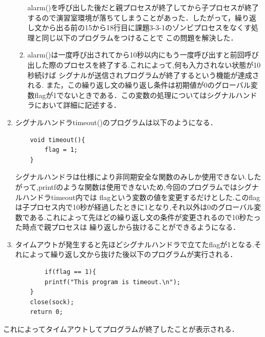 \documentclass[dvipdfmx]{jarticle}
\begin{document}
\begin{enumerate}
\begin{enumerate}
        alarm()を呼び出した後だと親プロセスが終了してから子プロセスが終了するので演習室環境が落ちてしまうことがあった．したがって，繰り返し文から出る前の15から18行目に課題3-3-1のゾンビプロセスをなくす処理と同じ以下のプログラムをつけることで
        この問題を解決した．
        \item alarm()は一度呼び出されてから10秒以内にもう一度呼び出すと前回呼び出した際のプロセスを終了する.これによって,何も入力されない状態が10秒続けば
        シグナルが送信されプログラムが終了するという機能が達成される.
        また，この繰り返し文の繰り返し条件は初期値が0のグローバル変数flagが1でないときである．この変数の処理についてはシグナルハンドラにおいて詳細に記述する．
    \end{enumerate}
    \item シグナルハンドラtimeout()のプログラムは以下のようになる．
    \begin{lstlisting}
    void timeout(){
        flag = 1;
    }
    \end{lstlisting}
    シグナルハンドラは仕様により非同期安全な関数のみしか使用できない.したがって,printfのような関数は使用できないため,今回のプログラムではシグナルハンドラtimeout内では
    flagという変数の値を変更するだけとした.このflagは子プロセス内で10秒が経過したときに1となり,それ以外は0のグローバル変数である.これによって先ほどの繰り返し文の条件が変更されるので10秒たった時点で親プロセスは
    繰り返しから抜けることができるようになる．
    \item タイムアウトが発生すると先ほどシグナルハンドラで立てたflagが1となる.それによって繰り返し文から抜けた後以下のプログラムが実行される．
    \begin{lstlisting}
        if(flag == 1){
        printf("This program is timeout.\n");
    }
    close(sock);
    return 0;
    \end{lstlisting}
\end{enumerate}
これによってタイムアウトしてプログラムが終了したことが表示される．
\end{document}
